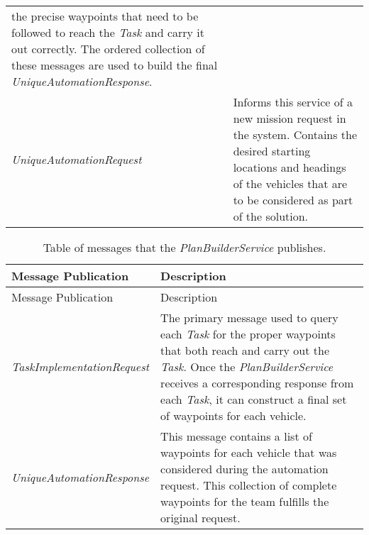 \begin{longtable}[c]{@{}ll@{}}
\begin{minipage}[t]{0.65\columnwidth}
the precise waypoints that need to be followed to reach the \emph{Task}
and carry it out correctly. The ordered collection of these messages are
used to build the final \emph{UniqueAutomationResponse}.
\strut\end{minipage}\tabularnewline
\begin{minipage}[t]{0.29\columnwidth}\raggedright\strut
\emph{UniqueAutomationRequest}
\strut\end{minipage} &
\begin{minipage}[t]{0.65\columnwidth}\raggedright\strut
Informs this service of a new mission request in the system. Contains
the desired starting locations and headings of the vehicles that are to
be considered as part of the solution.
\strut\end{minipage}\tabularnewline
\bottomrule
\end{longtable}

\begin{longtable}[c]{@{}ll@{}}
\caption{Table of messages that the \emph{PlanBuilderService}
publishes.}\tabularnewline
\toprule
\begin{minipage}[b]{0.29\columnwidth}\raggedright\strut
Message Publication
\strut\end{minipage} &
\begin{minipage}[b]{0.65\columnwidth}\raggedright\strut
Description
\strut\end{minipage}\tabularnewline
\midrule
\endfirsthead
\toprule
\begin{minipage}[b]{0.29\columnwidth}\raggedright\strut
Message Publication
\strut\end{minipage} &
\begin{minipage}[b]{0.65\columnwidth}\raggedright\strut
Description
\strut\end{minipage}\tabularnewline
\midrule
\endhead
\begin{minipage}[t]{0.29\columnwidth}\raggedright\strut
\emph{TaskImplementationRequest}
\strut\end{minipage} &
\begin{minipage}[t]{0.65\columnwidth}\raggedright\strut
The primary message used to query each \emph{Task} for the proper
waypoints that both reach and carry out the \emph{Task}. Once the
\emph{PlanBuilderService} receives a corresponding response from each
\emph{Task}, it can construct a final set of waypoints for each vehicle.
\strut\end{minipage}\tabularnewline
\begin{minipage}[t]{0.29\columnwidth}\raggedright\strut
\emph{UniqueAutomationResponse}
\strut\end{minipage} &
\begin{minipage}[t]{0.65\columnwidth}\raggedright\strut
This message contains a list of waypoints for each vehicle that was
considered during the automation request. This collection of complete
waypoints for the team fulfills the original request.
\strut\end{minipage}\tabularnewline
\bottomrule
\end{longtable}

